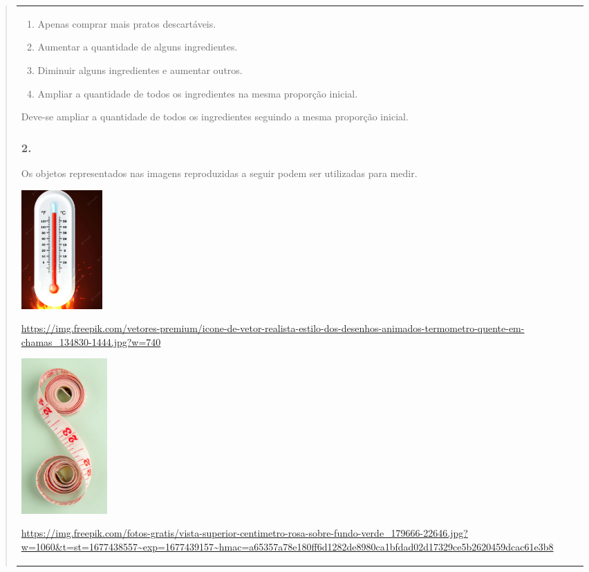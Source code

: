 \begin{mdframed}[linewidth=2pt,linecolor=salmao,roundcorner=2pt]
\begin{itemize}
{\begin{itemize}
\begin{escolha}
{\begin{quote}
{\begin{escolha}
{{{{{\begin{longtable}[]{@{}l@{}}
\begin{itemize}
\begin{enumerate}
\item
  Apenas comprar mais pratos descartáveis.
\item
  Aumentar a quantidade de alguns ingredientes.
\item
  Diminuir alguns ingredientes e aumentar outros.
\item
  Ampliar a quantidade de todos os ingredientes na mesma proporção
  inicial.
\end{enumerate}

Deve-se ampliar a quantidade de todos os ingredientes seguindo a mesma
proporção inicial.

\subsubsection{2. }

Os objetos representados nas imagens reproduzidas a seguir podem ser utilizadas para medir.

\includegraphics[width=1.22500in,height=1.79354in]{media/image128.png}

\url{https://img.freepik.com/vetores-premium/icone-de-vetor-realista-estilo-dos-desenhos-animados-termometro-quente-em-chamas_134830-1444.jpg?w=740}

\includegraphics[width=1.29167in,height=2.33463in]{media/image129.png}

\url{https://img.freepik.com/fotos-gratis/vista-superior-centimetro-rosa-sobre-fundo-verde_179666-22646.jpg?w=1060\&t=st=1677438557~exp=1677439157~hmac=a65357a78e180ff6d1282de8980ca1bfdad02d17329ce5b2620459dcac61e3b8}


\end{itemize}
\end{longtable}}}}}}
\end{escolha}}
\end{quote}}
\end{escolha}
\end{itemize}}
\end{itemize}
\end{mdframed}
